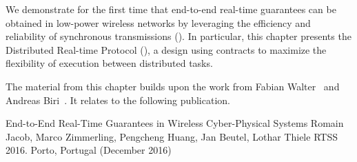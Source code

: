 \pagebreak

We demonstrate for the first time that end-to-end real-time guarantees can be obtained in low-power wireless networks by leveraging the efficiency and reliability of synchronous transmissions (\ST).
In particular, this chapter presents the Distributed Real-time Protocol (\DRP), a design using contracts to maximize the flexibility of execution between distributed tasks.

\begin{publi}

  The material from this chapter builds upon the work from Fabian Walter~\cite{walter2017Realtime} and Andreas Biri~\cite{biri2017Unleashing}. It relates to the following publication.

  \inlineRef%
  {End-to-End Real-Time Guarantees in Wireless Cyber-Physical Systems}%
  {Romain Jacob, Marco Zimmerling, Pengcheng Huang, Jan Beutel, Lothar Thiele}%
  {RTSS 2016. Porto, Portugal (December 2016)}

\end{publi}
